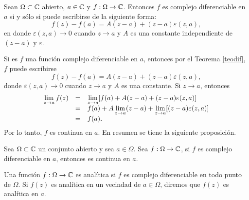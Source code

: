 \begin{teor}\label{teodif}
	Sean $\Omega\subset \mathbb{C}$ abierto, $a\in\mathbb{C}$ y $f:\Omega\rightarrow\mathbb{C}$. Entonces $f$ es complejo diferenciable en $a$ si y sólo si puede escribirse de la siguiente forma:
	\begin{equation}
		f(z)-f(a)=A(z-a)+(z-a)\varepsilon(z,a),
	\end{equation}
	 en donde $\varepsilon(z,a)\rightarrow 0$ cuando $z\rightarrow a$ y $A$ es una constante independiente de $(z-a)$ y $\varepsilon$.
	
\end{teor}

Si es $f$ una función complejo diferenciable en $a$, entonces por el Teorema \ref{teodif}, $f$ puede escribirse 
$$f(z)-f(a)=A(z-a)+(z-a)\varepsilon(z,a),$$
donde $\varepsilon(z,a)\rightarrow 0$ cuando $z\rightarrow a$ y $A$ es una constante. Si $z\rightarrow a$, entonces
\[
\begin{array}{ccl}
	\displaystyle\lim_{z\rightarrow a}f(z)&=&\displaystyle\lim_{z\rightarrow a}[f(a)+A(z-a)+(z-a)\varepsilon(z,a)]\\
	&=&f(a)+A\displaystyle\lim_{z\rightarrow a}(z-a)+\displaystyle\lim_{z\rightarrow a}[(z-a)\varepsilon(z,a)]\\
	&=&f(a).
\end{array}
\]
Por lo tanto, $f$ es continua en $a$. En resumen se tiene la siguiente proposición.
\begin{prop}
	Sea $\Omega\subset \mathbb{C}$ un conjunto abierto y sea $a \in \Omega$. Sea $f:\Omega\rightarrow\mathbb{C}$, si $f$ es complejo diferenciable en $a$, entonces es continua en $a$.
\end{prop}
\begin{defi}
	Una función $f:\Omega\rightarrow\mathbb{C}$ es analítica si $f$ es complejo diferenciable en todo punto de  $\Omega$. Si $f(z)$ es analítica en un vecindad de $a\in \Omega$, diremos que $f(z)$ es analítica en $a$.
\end{defi}

